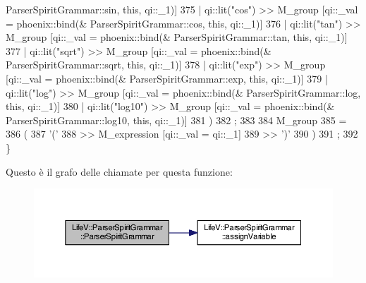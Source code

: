 \begin{DoxyCode}
      ParserSpiritGrammar::sin, \textcolor{keyword}{this},   qi::\_1)]
375         |   qi::lit(\textcolor{stringliteral}{"cos"})   >> M\_group                  [qi::\_val = phoenix::bind(&
      ParserSpiritGrammar::cos, \textcolor{keyword}{this},   qi::\_1)]
376         |   qi::lit(\textcolor{stringliteral}{"tan"})   >> M\_group                  [qi::\_val = phoenix::bind(&
      ParserSpiritGrammar::tan, \textcolor{keyword}{this},   qi::\_1)]
377         |   qi::lit(\textcolor{stringliteral}{"sqrt"})  >> M\_group                  [qi::\_val = phoenix::bind(&
      ParserSpiritGrammar::sqrt, \textcolor{keyword}{this},  qi::\_1)]
378         |   qi::lit(\textcolor{stringliteral}{"exp"})   >> M\_group                  [qi::\_val = phoenix::bind(&
      ParserSpiritGrammar::exp, \textcolor{keyword}{this},   qi::\_1)]
379         |   qi::lit(\textcolor{stringliteral}{"log"})   >> M\_group                  [qi::\_val = phoenix::bind(&
      ParserSpiritGrammar::log, \textcolor{keyword}{this},   qi::\_1)]
380         |   qi::lit(\textcolor{stringliteral}{"log10"}) >> M\_group                  [qi::\_val = phoenix::bind(&
      ParserSpiritGrammar::log10, \textcolor{keyword}{this}, qi::\_1)]
381         )
382         ;
383 
384     M\_group
385     =
386         (
387             \textcolor{charliteral}{'('}
388         >>  M\_expression                                 [qi::\_val = qi::\_1]
389         >>  \textcolor{charliteral}{')'}
390         )
391         ;
392 \}
\end{DoxyCode}


Questo è il grafo delle chiamate per questa funzione\-:\nopagebreak
\begin{figure}[H]
\begin{center}
\leavevmode
\includegraphics[width=350pt]{classLifeV_1_1ParserSpiritGrammar_afd12d0ca36622930f0c5e574c96acaa7_cgraph}
\end{center}
\end{figure}


